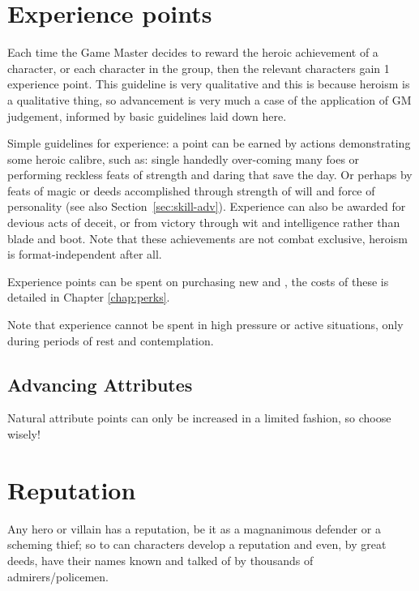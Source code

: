 \documentclass[a4paper,10pt,oneside]{book}
\newcommand{\textlf}[1]{\textbf{\titlecap{#1}}}
\begin{document}
\section{Experience points}
Each time the Game Master decides to reward the heroic achievement of a character, or each character in the group, then the relevant characters gain 1 experience point. 
This guideline is very qualitative and this is because heroism is a qualitative thing, so advancement is very much a case of the application of GM judgement, informed by basic guidelines laid down here.

Simple guidelines for experience: a point can be earned by actions demonstrating some heroic calibre, such as: single handedly over-coming many foes or performing reckless feats of strength and daring that save the day. Or perhaps by feats of magic or deeds accomplished through strength of will and force of personality (see also Section~\ref{sec:skill-adv}). Experience can also be awarded for devious acts of deceit, or from victory through wit and intelligence rather than blade and boot. Note that these achievements are not combat exclusive, heroism is format-independent after all.

Experience points can be spent on purchasing new \textlf{perks} and \textlf{proficiencies}, the costs of these is detailed in Chapter \ref{chap:perks}. 


Note that experience cannot be spent in high pressure or active situations, only during periods of rest and contemplation.

\subsection{Advancing Attributes}
Natural attribute points can only be increased in a limited fashion, so choose wisely!



\section{Reputation}
Any hero or villain has a reputation, be it as a magnanimous defender or a scheming thief; so to can characters develop a reputation and even, by great deeds, have their names known and talked of by thousands of admirers/policemen. 
\end{document}
